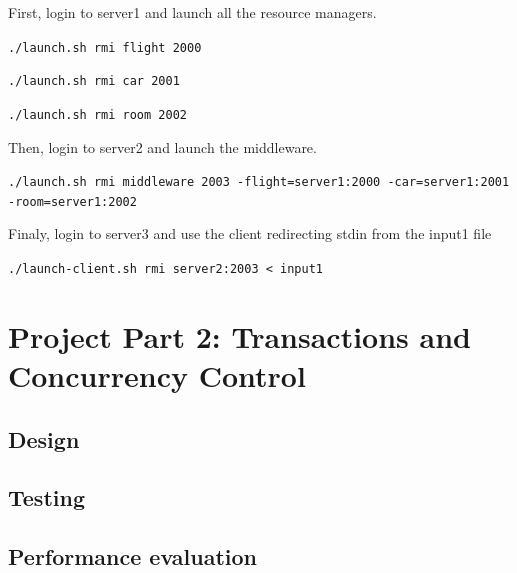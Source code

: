 \documentclass[a4paper]{article}
\begin{document}
First, login to server1 and launch all the resource managers.

{\tt ./launch.sh rmi flight 2000}

{\tt ./launch.sh rmi car 2001}

{\tt ./launch.sh rmi room 2002}

Then, login to server2 and launch the middleware.

{\tt ./launch.sh rmi middleware 2003 -flight=server1:2000 -car=server1:2001 -room=server1:2002}

Finaly, login to server3 and use the client redirecting stdin from the input1 file
 
{\tt ./launch-client.sh rmi server2:2003 < input1}

\section{Project Part 2: Transactions and Concurrency Control}
\subsection{Design}
\subsection{Testing}
\subsection{Performance evaluation}

%
%
\end{document}
